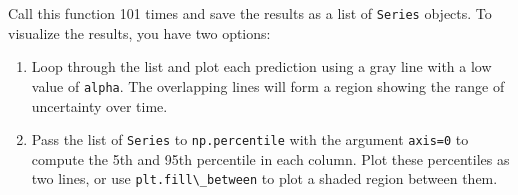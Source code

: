 \pagebreak

Call this function 101 times and save the results as a list of
\passthrough{\lstinline!Series!} objects. To visualize the results, you
have two options:

\begin{enumerate}
\def\labelenumi{\arabic{enumi}.}
\item
  Loop through the list and plot each prediction using a gray line with
  a low value of \passthrough{\lstinline!alpha!}. The overlapping lines
  will form a region showing the range of uncertainty over time.
\item
  Pass the list of \passthrough{\lstinline!Series!} to
  \passthrough{\lstinline!np.percentile!} with the argument
  \passthrough{\lstinline!axis=0!} to compute the 5th and 95th
  percentile in each column. Plot these percentiles as two lines, or use
  \passthrough{\lstinline!plt.fill\_between!} to plot a shaded region
  between them.
\end{enumerate}
